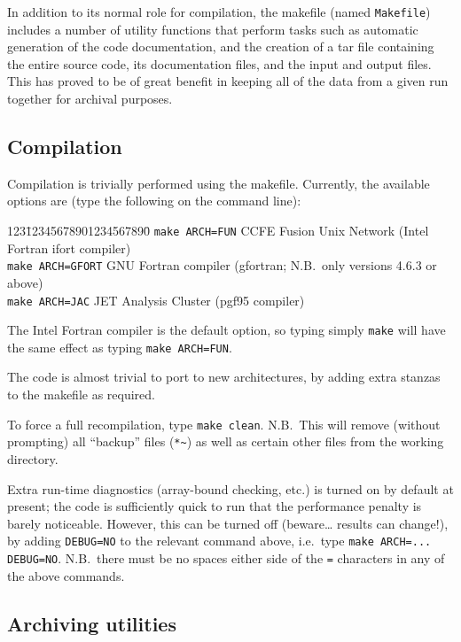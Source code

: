 \documentclass[11pt,a4paper]{report}
\begin{document}
In addition to its normal role for compilation, the makefile (named
\texttt{Makefile}) includes a number of utility functions that perform tasks
such as automatic generation of the code documentation, and the creation of a
tar file containing the entire source code, its documentation files, and the
input and output files. This has proved to be of great benefit in keeping all
of the data from a given run together for archival purposes.

\subsection{Compilation}

Compilation is trivially performed using the makefile. Currently, the
available options are (type the following on the command line):
\begin{tabbing}
123\=12345678901234567890\= \kill
\> \texttt{make ARCH=FUN} \> CCFE Fusion Unix Network (Intel Fortran ifort compiler) \\
\> \texttt{make ARCH=GFORT} \> GNU Fortran compiler (gfortran; N.B.\ only versions
4.6.3 or above) \\
\> \texttt{make ARCH=JAC} \> JET Analysis Cluster (pgf95 compiler)
\end{tabbing}
The Intel Fortran compiler is the default option, so typing simply
\texttt{make} will have the same effect as typing \texttt{make ARCH=FUN}.

The code is almost trivial to port to new architectures, by adding extra
stanzas to the makefile as required.

To force a full recompilation, type \texttt{make clean}. N.B.\ This will
remove (without prompting) all ``backup'' files (\texttt{*\~}) as well as
certain other files from the working directory.

Extra run-time diagnostics (array-bound checking, etc.) is turned on by
default at present; the code is sufficiently quick to run that the performance
penalty is barely noticeable. However, this can be turned off (beware\ldots
results can change!), by adding \texttt{DEBUG=NO} to the relevant command
above, i.e.\ type \verb+make ARCH=... DEBUG=NO+.  N.B.\ there must be no
spaces either side of the \texttt{=} characters in any of the above commands.

\subsection{Archiving utilities}
\end{document}

